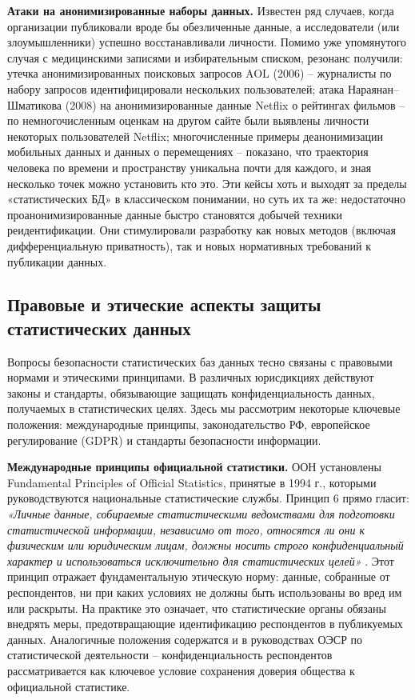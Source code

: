 \textbf{Атаки на анонимизированные наборы данных.}
Известен ряд случаев, когда организации публиковали вроде бы обезличенные данные, а исследователи (или злоумышленники) успешно
восстанавливали личности. Помимо уже упомянутого случая с медицинскими записями и избирательным списком, резонанс
получили: утечка анонимизированных поисковых запросов AOL (2006) – журналисты по набору запросов идентифицировали
нескольких пользователей; атака Нараянан–Шматикова (2008) на анонимизированные данные Netflix о рейтингах фильмов – по
немногочисленным оценкам на другом сайте были выявлены личности некоторых пользователей Netflix; многочисленные примеры
деанонимизации мобильных данных и данных о перемещениях – показано, что траектория человека по времени и пространству
уникальна почти для каждого, и зная несколько точек можно установить кто это. Эти кейсы хоть и выходят за пределы
«статистических БД» в классическом понимании, но суть их та же: недостаточно проанонимизированные данные быстро
становятся добычей техники реидентификации. Они стимулировали разработку как новых методов (включая дифференциальную
приватность), так и новых нормативных требований к публикации данных.

\subsection{Правовые и этические аспекты защиты статистических данных}
Вопросы безопасности статистических баз данных тесно связаны с правовыми нормами и этическими принципами. В различных
юрисдикциях действуют законы и стандарты, обязывающие защищать конфиденциальность данных, получаемых в статистических
целях. Здесь мы рассмотрим некоторые ключевые положения: международные принципы, законодательство РФ, европейское
регулирование (GDPR) и стандарты безопасности информации.

\textbf{Международные принципы официальной статистики.} ООН
установлены Fundamental Principles of Official Statistics, принятые в 1994 г., которыми руководствуются национальные
статистические службы. Принцип 6 прямо гласит: \textit{«Личные данные, собираемые статистическими ведомствами для
подготовки статистической информации, независимо от того, относятся ли они к физическим или юридическим лицам, должны
носить строго конфиденциальный характер и использоваться исключительно для статистических целей»}
\autocite{unstats-un-org}. Этот принцип отражает фундаментальную этическую норму: данные, собранные от респондентов, ни
при каких условиях не должны быть использованы во вред им или раскрыты. На практике это означает, что статистические
органы обязаны внедрять меры, предотвращающие идентификацию респондентов в публикуемых данных. Аналогичные положения
содержатся и в руководствах ОЭСР по статистической деятельности – конфиденциальность респондентов рассматривается как
ключевое условие сохранения доверия общества к официальной статистике.

